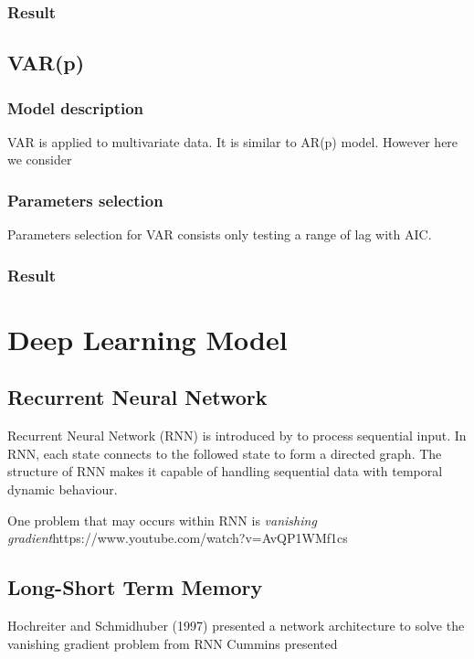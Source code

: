 \documentclass[12pt]{article}
\begin{document}
\subsubsection{Result}

\subsection{VAR(p)}
\subsubsection{Model description}
VAR is applied to multivariate data. It is similar to AR(p) model. However here
we consider 
\subsubsection{Parameters selection}
Parameters selection for VAR consists only testing a range of lag with AIC. 
\subsubsection{Result}


\section{Deep Learning Model}
\subsection{Recurrent Neural Network}
Recurrent Neural Network (RNN) is introduced by \cite{rumelhart1988learning} to
process sequential input. In RNN, each state connects to the followed state to form a directed
graph. The structure of RNN makes it capable of handling sequential data with
temporal dynamic behaviour.

One problem that may occurs within RNN is \textit{vanishing gradient}https://www.youtube.com/watch?v=AvQP1WMf1cs
\cite{hochreiter2001gradient}

\subsection{Long-Short Term Memory}
Hochreiter and Schmidhuber (1997) \cite{gers1999learning} presented a network
architecture to solve the vanishing gradient problem from RNN
Cummins presented 
\end{document}
